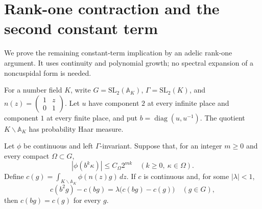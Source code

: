 
\section{Rank-one contraction and the second constant term}
\label{sec:sr-theta-two-step-contraction}

We prove the remaining constant-term implication by an adelic
rank-one argument. It uses continuity and polynomial growth;
no spectral expansion of a noncuspidal form is needed.

For a number field \(K\), write \(G=\mathrm{SL}_2(\mathbb A_K)\),
\(\Gamma=\mathrm{SL}_2(K)\), and
\(n(z)=\left(\begin{smallmatrix}1&z\\0&1\end{smallmatrix}\right)\).
Let \(u\) have component \(2\) at every infinite place and component
\(1\) at every finite place, and put
\(b=\operatorname{diag}(u,u^{-1})\).
The quotient \(K\backslash\mathbb A_K\) has probability Haar measure.

\begin{srlemma}
\label{lem:sr-theta-rank-one-contraction}
Let \(\phi\) be continuous and left \(\Gamma\)-invariant. Suppose that,
for an integer \(m\ge0\) and every compact \(\Omega\subset G\),
\[
 |\phi(b^k\kappa)|\le C_\Omega 2^{mk}
       \quad(k\ge0,\ \kappa\in\Omega).
 \tag{R1}\label{eq:sr-contraction-growth}
\]
Define \(c(g)=\int_{K\backslash\mathbb A_K}\phi(n(z)g)\,dz\).
If \(c\) is continuous and, for some \(|\lambda|<1\),
\[
 c(b^2g)-c(bg)=\lambda\bigl(c(bg)-c(g)\bigr)
                         \quad(g\in G),             \tag{R2}
 \label{eq:sr-contraction-recurrence}
\]
then \(c(bg)=c(g)\) for every \(g\).
\end{srlemma}

